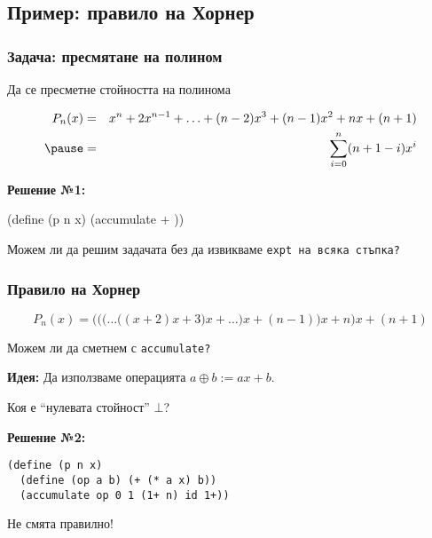 \documentclass{beamer}
\begin{document}
\subsection{Пример: правило на Хорнер}

\newcommand{\pnx}{x^n + 2x^{n-1} + \ldots + (n-2)x^3 + (n-1)x^2 + nx + (n+1)}

\begin{frame}[fragile]
  \frametitle{Задача: пресмятане на полином}

  Да се пресметне стойността на полинома

  \begin{eqnarray*}
  P_n(x) &=& \pnx\\
\pause   &=& \sum_{i=0}^n (n+1-i)x^i
  \end{eqnarray*}
  \pause

  \textbf{Решение №1:}
\begin{semiverbatim}
(define (p n x)
  (accumulate \rvl+     ))
\end{semiverbatim}

  \pause

  \vspace{1em}
  \alert{Можем ли да решим задачата без да извикваме \tt{expt} на всяка стъпка?}
\end{frame}

\newcommand{\pnxh}{\Bigg(\bigg(\Big(\ldots\big((x + 2)x + 3\big)x + \ldots\Big)x + (n-1)\bigg)x + n\Bigg)x + (n+1)}

\begin{frame}[fragile]
  \frametitle{Правило на Хорнер}

  \begin{equation*}
    P_n(x) = \pnxh
  \end{equation*}

  \pause

  \alert{Можем ли да сметнем с \tt{accumulate}?}

  \pause

  \textbf{Идея:} Да използваме операцията $a \oplus b := ax + b$.

  \pause

  \alert{Коя е ``нулевата стойност''  $\bot$?}
  \vspace{1em}

  \pause

  \textbf{Решение №2:}
\begin{verbatim}
(define (p n x)
  (define (op a b) (+ (* a x) b))
  (accumulate op 0 1 (1+ n) id 1+))
\end{verbatim}

  \pause

  \alert{Не смята правилно!}
\end{frame}
\end{document}
